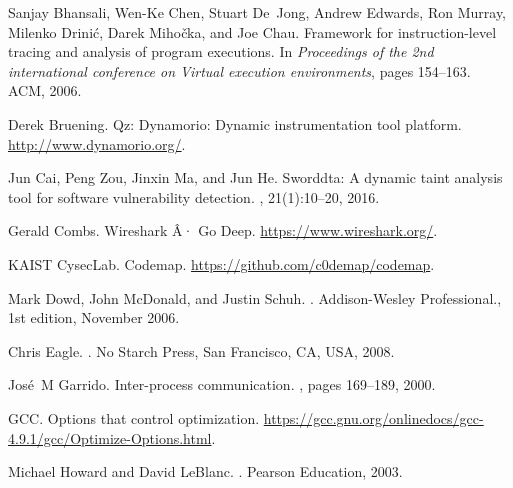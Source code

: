 \documentclass[12pt,oneside]{book}
\newcommand\TOCadd[1]{\newpage\phantomsection\addcontentsline{toc}{chapter}{#1}}
\providecommand{\DIFaddbegin}{} %
\newcommand{\DIFaddincludegraphics}[2][]{{\color{blue}\fbox{\DIFOincludegraphics[#1]{#2}}}} %
\DeclareRobustCommand{\DIFaddbegin}{\DIFOaddbegin \let\includegraphics\DIFaddincludegraphics} %
\begin{document}
	\TOCadd{Bibliography}
	
	\begin{thebibliography}{10}

Sanjay Bhansali, Wen-Ke Chen, Stuart De~Jong, Andrew Edwards, Ron Murray,
  Milenko Drini{\'c}, Darek Miho{\v{c}}ka, and Joe Chau.
\newblock Framework for instruction-level tracing and analysis of program
  executions.
\newblock In {\em Proceedings of the 2nd international conference on Virtual
  execution environments}, pages 154--163. ACM, 2006.

Derek Bruening.
\newblock Qz: Dynamorio: Dynamic instrumentation tool platform.
\newblock \url{http://www.dynamorio.org/}.

Jun Cai, Peng Zou, Jinxin Ma, and Jun He.
\newblock Sworddta: A dynamic taint analysis tool for software vulnerability
  detection.
, 21(1):10--20,
  2016.

Gerald Combs.
\newblock Wireshark Â· {Go} {Deep}.
\newblock \url{https://www.wireshark.org/}.

KAIST CysecLab.
\newblock Codemap.
\newblock \url{https://github.com/c0demap/codemap}.

Mark Dowd, John McDonald, and Justin Schuh.
.
\newblock Addison-Wesley Professional., 1st edition, November 2006.

Chris Eagle.
.
\newblock No Starch Press, San Francisco, CA, USA, 2008.

Jos{\'e}~M Garrido.
\newblock Inter-process communication.
, pages 169--189, 2000.

GCC.
\newblock Options that control optimization.
\newblock
  \url{https://gcc.gnu.org/onlinedocs/gcc-4.9.1/gcc/Optimize-Options.html}.

\DIFaddbegin {}

Michael Howard and David LeBlanc.
.
\newblock Pearson Education, 2003.


\end{thebibliography}
\end{document}
